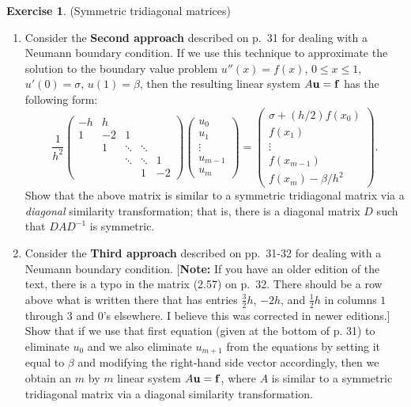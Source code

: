 \documentclass[12pt]{article}
\theoremstyle{definition}
\newtheorem{exer}{Exercise}
\theoremstyle{remark}
\begin{document}
\newpage

\begin{exer}
 (Symmetric tridiagonal matrices)
\begin{enumerate}
\item
Consider the {\bf Second approach} described on p.~31 for dealing with
a Neumann boundary condition.  If we use this technique to approximate
the solution to the boundary value problem $u'' (x) = f(x)$, 
$0 \leq x \leq 1$, $u' (0) = \sigma$, $u(1) = \beta$, then the resulting
linear system $A {\bf u} = {\bf f}$ has the following form:
\[
\frac{1}{h^2} \left( \begin{array}{ccccc}
-h & h  &        &        &      \\
1  & -2 & 1      &        &      \\
   & 1  & \ddots & \ddots &      \\
   &    & \ddots & \ddots & 1    \\
   &    &        & 1      & -2 \end{array} \right)
\left( \begin{array}{c} u_0 \\ u_1 \\ \vdots \\ u_{m-1} \\ u_{m} \end{array} 
\right) =
\left( \begin{array}{c} \sigma + (h/2) f( x_0 ) \\ f( x_1 ) \\ \vdots \\ 
f( x_{m-1} ) \\ f( x_m ) - \beta / h^2 \end{array} \right) .
\]
Show that the above matrix is similar to a symmetric tridiagonal matrix 
via a {\em diagonal} similarity transformation; that is, there is a diagonal
matrix $D$ such that $D A D^{-1}$ is symmetric.
\item
Consider the {\bf Third approach} described on pp.~31-32 for dealing with
a Neumann boundary condition.  [{\bf Note:} If you have an older edition of the text,
there is a typo in the matrix (2.57) on p.~32.  There should be a row above what is written
there that has entries $\frac{3}{2} h$, $-2h$, and $\frac{1}{2} h$
in columns $1$ through $3$ and $0$'s elsewhere.  I believe this was corrected in newer editions.]  
Show that if we use that first equation
(given at the bottom of p. 31) to eliminate $u_0$ and we also eliminate
$u_{m+1}$ from the equations by setting it equal to $\beta$ and modifying
the right-hand side vector accordingly, then we obtain an $m$ by $m$
linear system $A {\bf u} = {\bf f}$, where $A$ is similar to a symmetric
tridiagonal matrix via a diagonal similarity transformation.
\end{enumerate}
\end{exer}
\end{document}

